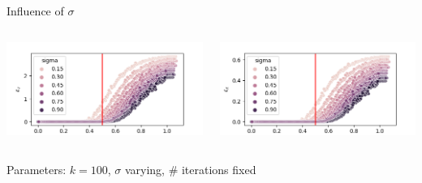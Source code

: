 \documentclass{beamer}
\begin{document}
\begin{frame}{Influence of $\sigma$}
	\begin{minipage}[0.95\textheight]{\textwidth}
	\begin{columns}[T]
	\begin{column}{0.50\textwidth}
	\includegraphics[width=\textwidth, keepaspectratio]{images/N100_sigmaA.png}
	\end{column}
	\begin{column}{0.50\textwidth}
	\includegraphics[width=\textwidth, keepaspectratio]{images/N100_sigmaAX.png}
	\end{column}
	\end{columns}
	\end{minipage}
	\begin{center}
		Parameters: $k=100$, $\sigma$ varying, \# iterations fixed
	\end{center}
\end{frame}
\end{document}
